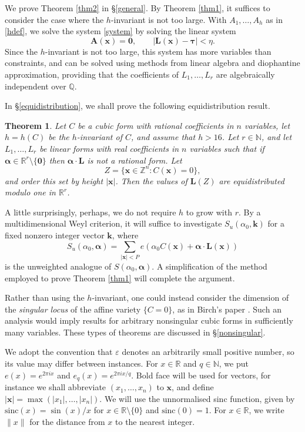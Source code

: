 \documentclass[12pt,reqno]{amsart}
\newtheorem{thm}{Theorem}[section]
\theoremstyle{definition}
\theoremstyle{remark}
\numberwithin{equation}{section}
\begin{document}
We prove Theorem \ref{thm2} in \S \ref{general}. By Theorem \ref{thm1}, it suffices to consider the case where the $h$-invariant is not too large. With $A_1, \ldots, A_h$ as in \eqref{hdef}, we solve the system \eqref{system} by solving the linear system
\[
{\mathbf A}({\mathbf x}) = {\mathbf 0}, \qquad |{\mathbf L}({\mathbf x}) - {\boldsymbol{\tau}}| < \eta.
\]
Since the $h$-invariant is not too large, this system has more variables than constraints, and can be solved using methods from linear algebra and diophantine approximation, providing that the coefficients of $L_1, \ldots, L_r$ are algebraically independent over ${\mathbb Q}$.

In \S \ref{equidistribution}, we shall prove the following equidistribution result.
\begin{thm} \label{thm3}
Let $C$ be a cubic form with rational coefficients in $n$ variables, let $h = h(C)$ be the $h$-invariant of $C$, and assume that $h > 16$. Let $r \in {\mathbb N}$, and let $L_1, \ldots, L_r$ be linear forms with real coefficients in $n$ variables such that if ${\boldsymbol{{\alpha}}} \in {\mathbb R}^r \setminus \{ {\mathbf 0} \}$ then ${\boldsymbol{{\alpha}}} \cdot {\mathbf L}$ is not a rational form. Let
\[
Z = \{ {\mathbf x} \in {\mathbb Z}^n: C({\mathbf x}) = 0 \},
\]
and order this set by height $|{\mathbf x}|$. Then the values of ${\mathbf L}(Z)$ are equidistributed modulo one in ${\mathbb R}^r$.
\end{thm}
A little surprisingly, perhaps, we do not require $h$ to grow with $r$. By a multidimensional Weyl criterion, it will suffice to investigate $S_u({{\alpha}}_0, {\mathbf k})$ for a fixed nonzero integer vector ${\mathbf k}$, where
\[
S_u({{\alpha}}_0, {\boldsymbol{{\alpha}}}) = \sum_{|{\mathbf x}| < P} e({{\alpha}}_0C({\mathbf x}) + {\boldsymbol{{\alpha}}} \cdot {\mathbf L}({\mathbf x}))
\]
is the unweighted analogue of $S({{\alpha}}_0, {\boldsymbol{{\alpha}}})$. A simplification of the method employed to prove Theorem \ref{thm1} will complete the argument. 

Rather than using the $h$-invariant, one could instead consider the dimension of the \emph{singular locus} of the affine variety $\{ C = 0 \}$, as in Birch's paper \cite{Bir1962}. Such an analysis would imply results for arbitrary nonsingular cubic forms in sufficiently many variables. These types of theorems are discussed in \S \ref{nonsingular}.

We adopt the convention that ${\varepsilon}$ denotes an arbitrarily small positive number, so its value may differ between instances. For $x \in {\mathbb R}$ and $q \in {\mathbb N}$, we put $e(x) = e^{2 \pi i x}$ and $e_q(x) = e^{2 \pi i x / q}$. Bold face will be used for vectors, for instance we shall abbreviate $(x_1,\ldots,x_n)$ to ${\mathbf x}$, and define $|{\mathbf x}| = \max(|x_1|, \ldots, |x_n|)$. We will use the unnormalised sinc function, given by ${\mathrm{sinc}}(x) = \sin(x)/x$ for $x \in {\mathbb R} \setminus \{0\}$ and ${\mathrm{sinc}}(0) = 1$. For $x \in {\mathbb R}$, we write $\| x \|$ for the distance from $x$ to the nearest integer.
\end{document}
